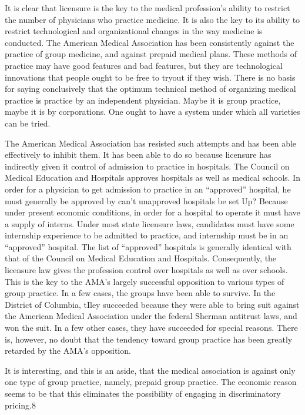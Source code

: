 \documentclass[11pt,openany]{book}
\begin{document}
It is clear that licensure is the key to the medical profession's ability to restrict the number of physicians who practice medicine. It is also the key to its ability to restrict technological and organizational changes in the way medicine is conducted. The American Medical Association has been consistently against the practice of group medicine, and against prepaid medical plans. These methods of practice may have good features and bad features, but they are technological innovations that people ought to be free to tryout if they wish. There is no basis for saying conclusively that the optimum technical method of organizing medical practice is practice by an independent physician. Maybe it is group practice, maybe it is by corporations. One ought to have a system under which all varieties can be tried.

The American Medical Association has resisted such attempts and has been able effectively to inhibit them. It has been able to do so because licensure has indirectly given it control of admission to practice in hospitals. The Council on Medical Education and Hospitals approves hospitals as well as medical schools. In order for a physician to get admission to practice in an ``approved'' hospital, he must generally be approved by can't unapproved hospitals be set Up? Because under present economic conditions, in order for a hospital to operate it must have a supply of interns. Under most state licensure laws, candidates must have some internship experience to be admitted to practice, and internship must be in an ``approved'' hospital. The list of ``approved'' hospitals is generally identical with that of the Council on Medical Education and Hospitals. Consequently, the licensure law gives the profession control over hospitals as well as over schools. This is the key to the AMA's largely successful opposition to various types of group practice. In a few cases, the groups have been able to survive. In the District of Columbia, tIley succeeded because they were able to bring suit against the American Medical Association under the federal Sherman antitrust laws, and won the suit. In a few other cases, they have succeeded for special reasons. There is, however, no doubt that the tendency toward group practice has been greatly retarded by the AMA's opposition.

It is interesting, and this is an aside, that the medical association is against only one type of group practice, namely, prepaid group practice. The economic reason seems to be that this eliminates the possibility of engaging in discriminatory pricing.8
\end{document}
